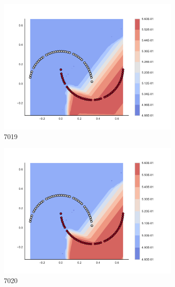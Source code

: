 \begin{figure}[h]
\begin{subfigure}[b]{0.09\textwidth}
    \includegraphics[clip, trim=2.35cm 1.75cm 4.5cm 0cm,width=\textwidth]{img/convergence/7019.pdf}
    \caption{7019}
    \label{fig:convergence_7019}
\end{subfigure}
%
\begin{subfigure}[b]{0.09\textwidth}
    \includegraphics[clip, trim=2.35cm 1.75cm 4.5cm 0cm,width=\textwidth]{img/convergence/7020.pdf}
    \caption{7020}
    \label{fig:convergence_7020}
\end{subfigure}
%
\begin{subfigure}[b]{0.09\textwidth}

\end{subfigure}
\end{figure}
